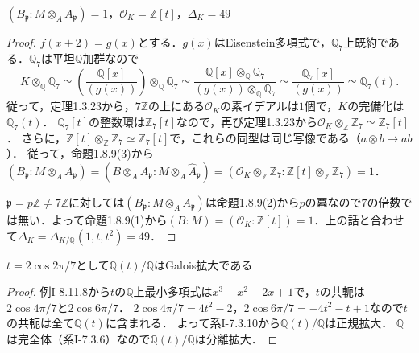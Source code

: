 \begin{screen}
  $(B_\mathfrak{p}:M\otimes_AA_\mathfrak{p})=1$，$\mathcal{O}_K=\mathbb{Z}[t]$，$\varDelta_K=49$
\end{screen}
\begin{proof}
  $f(x+2) = g(x)$とする．$g(x)$はEisenstein多項式で，$\mathbb{Q}_7$上既約である．$\mathbb{Q}_7$は平坦$\mathbb{Q}$加群なので
  \[ K \otimes_\mathbb{Q} \mathbb{Q}_7 \simeq \left( \frac{\mathbb{Q}[x]}{(g(x))} \right) \otimes_\mathbb{Q} \mathbb{Q}_7 \simeq \frac{\mathbb{Q}[x] \otimes_\mathbb{Q} \mathbb{Q}_7}{(g(x)) \otimes_\mathbb{Q} \mathbb{Q}_7} \simeq \frac{\mathbb{Q}_7[x]}{(g(x))} \simeq \mathbb{Q}_7(t). \]
  従って，定理1.3.23から，$7\mathbb{Z}$の上にある$\mathcal{O}_K$の素イデアルは$1$個で，$K$の完備化は$\mathbb{Q}_7(t)$．
  $\mathbb{Q}_7[t]$の整数環は$\mathbb{Z}_7[t]$なので，再び定理1.3.23から$\mathcal{O}_K\otimes_\mathbb{Z}\mathbb{Z}_7\simeq\mathbb{Z}_7[t]$．
  さらに，$\mathbb{Z}[t]\otimes_\mathbb{Z}\mathbb{Z}_7 \simeq \mathbb{Z}_7[t]$で，これらの同型は同じ写像である（$a \otimes b \mapsto ab$）．
  従って，命題1.8.9(3)から$(B_\mathfrak{p}:M\otimes_AA_\mathfrak{p}) = (B\otimes_A\widehat{A}_\mathfrak{p}:M\otimes_A\widehat{A}_\mathfrak{p}) = (\mathcal{O}_K\otimes_\mathbb{Z}\mathbb{Z}_7:\mathbb{Z}[t]\otimes_\mathbb{Z}\mathbb{Z}_7) = 1$．

  $\mathfrak{p}=p\mathbb{Z}\neq7\mathbb{Z}$に対しては$(B_\mathfrak{p}:M\otimes_AA_\mathfrak{p})$は命題1.8.9(2)から$p$の冪なので$7$の倍数では無い．よって命題1.8.9(1)から$(B:M)=(\mathcal{O}_K:\mathbb{Z}[t])=1$．上の話と合わせて$\varDelta_K=\varDelta_{K/\mathbb{Q}}(1, t, t^2)=49$．
\end{proof}

\begin{screen}
  $t=2\cos2\pi/7$として$\mathbb{Q}(t)/\mathbb{Q}$はGalois拡大である
\end{screen}
\begin{proof}
  例I-8.11.8から$t$の$\mathbb{Q}$上最小多項式は$x^3+x^2-2x+1$で，$t$の共軛は$2\cos4\pi/7$と$2\cos6\pi/7$．
  $2\cos4\pi/7=4t^2-2$，$2\cos6\pi/7=-4t^2-t+1$なので$t$の共軛は全て$\mathbb{Q}(t)$に含まれる．
  よって系I-7.3.10から$\mathbb{Q}(t)/\mathbb{Q}$は正規拡大．
  $\mathbb{Q}$は完全体（系I-7.3.6）なので$\mathbb{Q}(t)/\mathbb{Q}$は分離拡大．
\end{proof}

